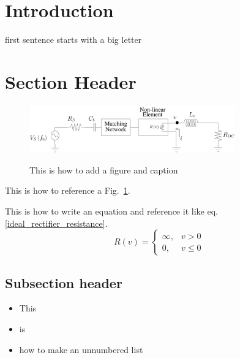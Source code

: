 \IEEEpeerreviewmaketitle

\section{Introduction}

 first sentence starts with a big letter

\section{Section Header}


\begin{figure}[!htb]
  \begin{center}
  \includegraphics[width=3.5in]{pdf/01.pdf}\\
  \caption{This is how to add a figure and caption}
  \label{circuit_diagram}
  \end{center}
\end{figure}

This is how to reference a Fig.~\ref{circuit_diagram}.

This is how to write an equation and reference it like eq. \ref{ideal_rectifier_resistance}.
\begin{equation}
\label{ideal_rectifier_resistance}
R(v) =
\begin{cases}
    \infty, & v > 0\\
    0, & v \leq 0
\end{cases}
\end{equation}

\subsection {Subsection header}

\begin{itemize}
    \item This
    \item is
    \item how to make an unnumbered list
\end{itemize}


